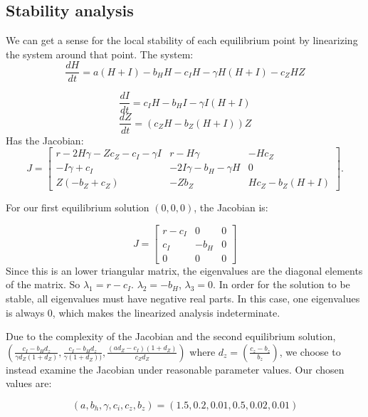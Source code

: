 \documentclass[
	12pt
]{article}
\begin{document}
\subsection{Stability analysis}

We can get a sense for the local stability of each equilibrium point by linearizing the system around that point. The system:
\begin{equation}
\frac{dH}{dt} = a(H+I)-b_HH-c_IH-\gamma H(H+I)-c_ZHZ
\end{equation}

\begin{equation}
\frac{dI}{dt} = c_IH-b_HI-\gamma I(H+I)
\end{equation}
\begin{equation}
\frac{dZ}{dt} = (c_ZH-b_Z(H+I))Z
\end{equation}
Has the Jacobian:
\begin{equation}
J = \begin{bmatrix}
r-2H\gamma - Zc_Z - c_I - \gamma I & r-H\gamma & -Hc_Z \\
-I\gamma + c_I & -2I\gamma - b_H - \gamma H & 0 \\
 Z(-b_Z + c_Z) & -Zb_Z & Hc_Z - b_Z(H + I)
\end{bmatrix}.
\end{equation}

For our first equilibrium solution $(0, 0, 0)$, the Jacobian is:

\begin{equation}
J=\begin{bmatrix} r-c_I& 0 & 0 \\ c_I & - b_H & 0 \\ 0 & 0 & 0 \end{bmatrix}
\end{equation}
Since this is an lower triangular matrix, the eigenvalues are the diagonal elements of the matrix. So $\lambda_1=r-c_I$. $\lambda_2=-b_H$, $\lambda_3=0$. In order for the solution to be stable, all eigenvalues must have negative real parts. In this case, one eigenvalues is always $0$, which makes the linearized analysis indeterminate.

Due to the complexity of the Jacobian and the second equilibrium solution, $(\frac{c_I-b_Hd_z}{\gamma d_Z(1+d_Z)},  \frac{c_I-b_Hd_z}{\gamma (1+d_Z))} , \frac{(ad_Z-c_I)(1+d_Z)}{c_Zd_Z})$ where $d_z = \left(\frac{c_z-b_z}{b_z}\right)$, we choose to instead examine the Jacobian under reasonable parameter values. Our chosen values are:

\begin{equation}
(a,b_h,\gamma,c_i,c_z,b_z)=(1.5,0.2,0.01,0.5,0.02,0.01)
\end{equation}
\end{document}
